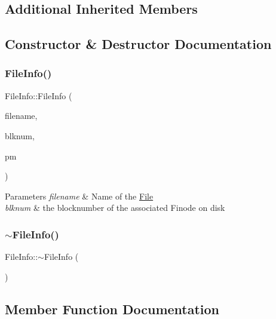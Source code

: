 \subsection*{Additional Inherited Members}


\subsection{Constructor \& Destructor Documentation}
\mbox{\label{class_file_info_a3586bb4f50c4a0f63ff4ea0a1e56ce9c}} 
\subsubsection{\texorpdfstring{File\+Info()}{FileInfo()}}
{\footnotesize\ttfamily File\+Info\+::\+File\+Info (\begin{DoxyParamCaption}\item[{string}]{filename,  }\item[{Blk\+Num\+Type}]{blknum,  }\item[{\mbox{\hyperlink{class_partition_manager}{Partition\+Manager}} $\ast$}]{pm }\end{DoxyParamCaption})}


\begin{DoxyParams}{Parameters}
{\em filename} & Name of the \mbox{\hyperlink{class_file}{File}} \\
\hline
{\em blknum} & the blocknumber of the associated Finode on disk \\
\hline
\end{DoxyParams}
\mbox{\label{class_file_info_ab771dfaca29680c93810af82a7a99958}} 
\subsubsection{\texorpdfstring{$\sim$\+File\+Info()}{~FileInfo()}}
{\footnotesize\ttfamily File\+Info\+::$\sim$\+File\+Info (\begin{DoxyParamCaption}{ }\end{DoxyParamCaption})}



\subsection{Member Function Documentation}
\mbox{\label{class_file_info_a1537d2ac2b5c170d144911c8337c81bc}} 
